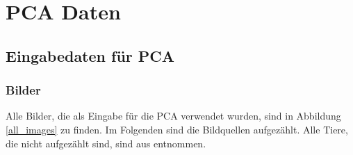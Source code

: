 \chapter{PCA Daten}
\label{appendix_pca}

\section{Eingabedaten für PCA}

\subsection{Bilder}
 
 Alle Bilder, die als Eingabe für die PCA verwendet wurden, sind in Abbildung \ref{all_images} zu finden. Im Folgenden sind die Bildquellen aufgezählt.
 Alle Tiere, die nicht aufgezählt sind, sind aus \cite{Spezielle_Zoologie} entnommen.
